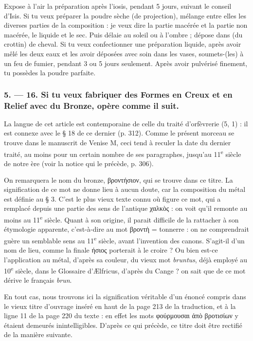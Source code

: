 \documentclass[a4paper, 11pt, oneside, polutonikogreek, french]{article}
\begin{document}
Expose à l'air la préparation après l'iosis, pendant 5 jours, suivant le conseil d'Isis. Si tu veux préparer la poudre sèche (de projection), mélange entre elles les diverses parties de la composition : je veux dire la partie macérée et la partie non macérée, le liquide et le sec. Puis délaie au soleil ou à l'ombre ; dépose dans (du crottin) de cheval. Si tu veux confectionner une préparation liquide, après avoir mêlé les deux eaux et les avoir déposées avec soin dans les vases, soumets-(les) à un feu de fumier, pendant 3 ou 5 jours seulement. Après avoir pulvérisé finement, tu possèdes la poudre parfaite.

\bigskip
\centerline{\EightStarTaper}
\centerline{\EightStarTaper\EightStarTaper}
\bigskip

\subsubsection{5. --- 16. Si tu veux fabriquer des Formes en Creux et en Relief avec du Bronze, opère comme il suit.}

La langue de cet article est contemporaine de celle du traité d'orfèvrerie (5, 1) : il est connexe avec le § 18 de ce dernier (p. 312). Comme le présent morceau se trouve dans le manuscrit de Venise M, ceci tend à reculer la date du dernier traité, au moins pour un certain nombre de ses paragraphes, jusqu'au 11\textsuperscript{e} siècle de notre ère (voir la notice qui le précède, p. 306).

On remarquera le nom du bronze, βροντήσιον, qui se trouve dans ce titre. La signification de ce mot ne donne lieu à aucun doute, car la composition du métal est définie au § 3. C'est le plus vieux texte connu où figure ce mot, qui a remplacé depuis une partie des sens de l'antique χαλκὸς : on voit qu'il remonte au moins au 11\textsuperscript{e} siècle. Quant à son origine, il parait difficile de la rattacher à son étymologie apparente, c'est-à-dire au mot βροντὴ = tonnerre : on ne comprendrait guère un semblable sens au 11\textsuperscript{e} siècle, avant l'invention des canons. S'agit-il d'un nom de lieu, comme la finale ήσιος porterait à le croire ? Ou bien est-ce l'application au métal, d'après sa couleur, du vieux mot \emph{bruntus}, déjà employé au 10\textsuperscript{e} siècle, dans le Glossaire d'Ælfricus, d'après du Cange ? on sait que de ce mot dérive le français \emph{brun}.

En tout cas, nous trouvons ici la signification véritable d'un énoncé compris dans le vieux titre d'ouvrage inséré en haut de la page 213 de la traduction, et à la ligne 11 de la page 220 du texte : en effet les mots φούρμουσαι ἀπὸ βροτισίων y étaient demeurés inintelligibles. D'après ce qui précède, ce titre doit être rectifié de la manière suivante.
\end{document}
